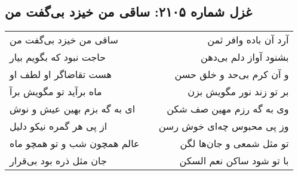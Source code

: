 \begin{center}
\section*{غزل شماره ۲۱۰۵: ساقی من خیزد بی‌گفت من}
\label{sec:2105}
\begin{longtable}{l p{0.5cm} r}
ساقی من خیزد بی‌گفت من
&&
آرد آن باده وافر ثمن
\\
حاجت نبود که بگویم بیار
&&
بشنود آواز دلم بی‌دهن
\\
هست تقاضاگر او لطف او
&&
و آن کرم بی‌حد و خلق حسن
\\
ماه برآید تو مگویش برآ
&&
بر تو زند نور مگویش بزن
\\
ای به گه بزم بهین عیش و نوش
&&
وی به گه رزم مهین صف شکن
\\
از پی هر گمره نیکو دلیل
&&
وز پی محبوس چه‌ای خوش رسن
\\
عالم همچون شب و تو همچو ماه
&&
تو مثل شمعی و جان‌ها لگن
\\
جان مثل ذره بود بی‌قرار
&&
با تو شود ساکن نعم السکن
\\
\end{longtable}
\end{center}
